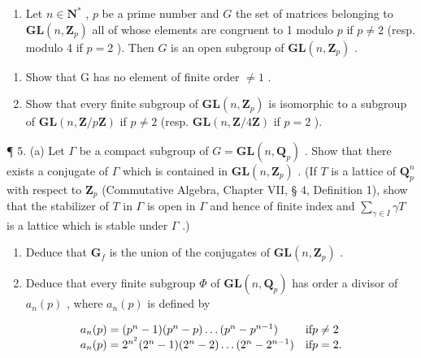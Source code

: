 \begin{enumerate}
\def\labelenumi{\arabic{enumi}.}
\setcounter{enumi}{3}
\tightlist
\item
  Let \(n \in \mathbf{N}^*\) , \(p\) be a prime number and \(G\) the set of matrices belonging to \(\mathbf{GL}(n, \mathbf{Z}_p)\) all of whose elements are congruent to 1 modulo \(p\) if \(p \neq 2\) (resp. modulo 4 if \(p = 2\) ). Then \(G\) is an open subgroup of \(\mathbf{GL}(n, \mathbf{Z}_p)\) .
\end{enumerate}

\begin{enumerate}
\def\labelenumi{(\alph{enumi})}
\item
  Show that G has no element of finite order \(\neq 1\) .
\item
  Show that every finite subgroup of \(\mathbf{GL}(n, \mathbf{Z}_p)\) is isomorphic to a subgroup of \(\mathbf{GL}(n, \mathbf{Z} / p\mathbf{Z})\) if \(p \neq 2\) (resp. \(\mathbf{GL}(n, \mathbf{Z} / 4\mathbf{Z})\) if \(p = 2\) ).
\end{enumerate}

¶ 5. (a) Let \(\Gamma\) be a compact subgroup of \(G = \mathbf{GL}(n, \mathbf{Q}_p)\) . Show that there exists a conjugate of \(\Gamma\) which is contained in \(\mathbf{GL}(n, \mathbf{Z}_p)\) . (If \(T\) is a lattice of \(\mathbf{Q}_p^n\) with respect to \(\mathbf{Z}_p\) (Commutative Algebra, Chapter VII, § 4, Definition 1), show that the stabilizer of \(T\) in \(\Gamma\) is open in \(\Gamma\) and hence of finite index and \(\sum_{\gamma \in I} \gamma T\) is a lattice which is stable under \(\Gamma\) .)

\begin{enumerate}
\def\labelenumi{(\alph{enumi})}
\setcounter{enumi}{1}
\item
  Deduce that \(\mathbf{G}_f\) is the union of the conjugates of \(\mathbf{GL}(n,\mathbf{Z}_p)\) .
\item
  Deduce that every finite subgroup \(\Phi\) of \(\mathbf{GL}(n, \mathbf{Q}_p)\) has order a divisor of \(a_n(p)\) , where \(a_n(p)\) is defined by
\end{enumerate}

\[
\begin{array}{l l} a _ {n} (p) = (p ^ {n} - 1) (p ^ {n} - p) \ldots (p ^ {n} - p ^ {n - 1}) & \text {if} p \neq 2 \\ a _ {n} (p) = 2 ^ {n ^ {2}} (2 ^ {n} - 1) (2 ^ {n} - 2) \ldots (2 ^ {n} - 2 ^ {n - 1}) & \text {if} p = 2. \end{array}
\]

